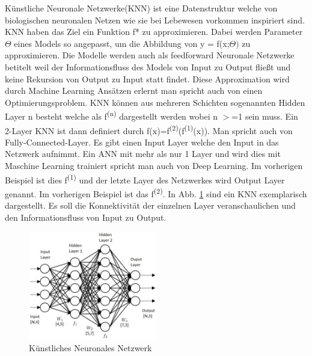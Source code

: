 \documentclass{llncs}
\begin{document}
	Künstliche Neuronale Netzwerke(KNN) ist eine Datenstruktur welche von biologischen neuronalen Netzen wie sie bei Lebewesen vorkommen inspiriert sind. KNN haben das Ziel ein Funktion f* zu approximieren. Dabei werden Parameter $\Theta$ eines Models so angepasst, um die Abbildung von y = f(x;$\Theta)$ zu approximieren. Die Modelle werden auch als feedforward Neuronale Netzwerke betitelt weil der Informationsfluss des Models von Input zu Output fließt und keine Rekursion von Output zu Input statt findet. Diese Approximation wird durch Machine Learning Ansätzen erlernt man spricht auch von einen Optimierungsproblem. KNN können aus mehreren Schichten sogenannten Hidden Layer n besteht welche als f\textsuperscript{(n)} dargestellt werden wobei n $>$=1 sein muss. Ein 2-Layer KNN ist dann definiert durch f(x)=f\textsuperscript{(2)}(f\textsuperscript{(1)}(x)). Man spricht auch von Fully-Connected-Layer. Es gibt einen Input Layer welche den Input in das Netzwerk aufnimmt\cite{Grundlagen}. Ein ANN mit mehr als nur 1 Layer und wird dies mit Maschine Learning trainiert spricht man auch von Deep Learning. Im vorherigen Beispiel ist dies f\textsuperscript{(1)} und der letzte Layer des Netzwerkes wird Output Layer genannt. Im vorherigen Beispiel ist das f\textsuperscript{(2)}. In Abb. \ref{fig:KNN} sind ein KNN exemplarisch dargestellt. Es soll die Konnektivität der einzelnen Layer veranschaulichen und den Informationsfluss von Input zu Output. 
	
	\begin{figure}[htbp]
		\centering
		\includegraphics[width=0.5\textwidth]{neuronalesnetzwerk.jpg}
		\caption{Künstliches Neuronales Netzwerk}
		\label{fig:KNN}
	\end{figure}
	
\end{document}
